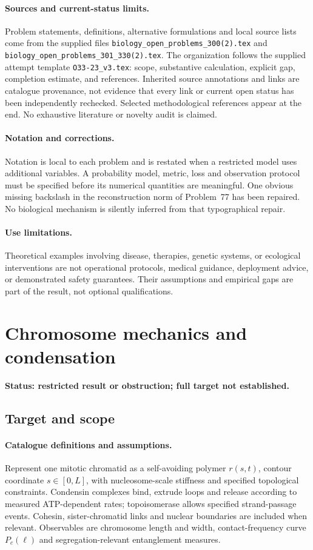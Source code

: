 \documentclass[11pt]{article}
\begin{document}
\paragraph{Sources and current-status limits.}
Problem statements, definitions, alternative formulations and local source lists
come from the supplied files
\texttt{biology\_open\_problems\_300(2).tex} and
\texttt{biology\_open\_problems\_301\_330(2).tex}.
The organization follows the supplied attempt template
\texttt{O33-23\_v3.tex}: scope, substantive calculation, explicit gap,
completion estimate, and references. Inherited source annotations and links are
catalogue provenance, not evidence that every link or current open status has
been independently rechecked. Selected methodological references appear at the
end. No exhaustive literature or novelty audit is claimed.

\paragraph{Notation and corrections.}
Notation is local to each problem and is restated when a restricted model uses
additional variables. A probability model, metric, loss and observation protocol
must be specified before its numerical quantities are meaningful. One obvious
missing backslash in the reconstruction norm of Problem~77 has been repaired.
No biological mechanism is silently inferred from that typographical repair.

\paragraph{Use limitations.}
Theoretical examples involving disease, therapies, genetic systems, or ecological
interventions are not operational protocols, medical guidance, deployment advice,
or demonstrated safety guarantees. Their assumptions and empirical gaps are part
of the result, not optional qualifications.


\section*{Chromosome mechanics and condensation}
\label{prob:089}
\noindent\textbf{Status: restricted result or obstruction; full target not established.}
\subsection{Target and scope}
\paragraph{Catalogue definitions and assumptions.}
Represent one mitotic chromatid as a self-avoiding polymer $r(s,t)$, contour coordinate $s\in[0,L]$, with nucleosome-scale stiffness and specified topological constraints. Condensin complexes bind, extrude loops and release according to measured ATP-dependent rates; topoisomerase allows specified strand-passage events. Cohesin, sister-chromatid links and nuclear boundaries are included when relevant. Observables are chromosome length and width, contact-frequency curve $P_c(\ell)$ and segregation-relevant entanglement measures.
\end{document}
